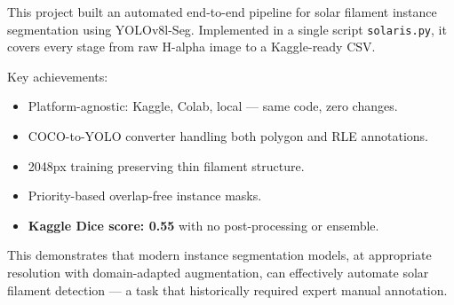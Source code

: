\documentclass[12pt,a4paper,openany]{report}
\begin{document}
This project built an automated end-to-end pipeline for solar filament instance segmentation
using YOLOv8l-Seg. Implemented in a single script \texttt{solaris.py}, it covers every stage
from raw H-alpha image to a Kaggle-ready CSV.

Key achievements:
\begin{itemize}
  \item Platform-agnostic: Kaggle, Colab, local --- same code, zero changes.
  \item COCO-to-YOLO converter handling both polygon and RLE annotations.
  \item 2048px training preserving thin filament structure.
  \item Priority-based overlap-free instance masks.
  \item \textbf{Kaggle Dice score: 0.55} with no post-processing or ensemble.
\end{itemize}

This demonstrates that modern instance segmentation models, at appropriate resolution with
domain-adapted augmentation, can effectively automate solar filament detection --- a task
that historically required expert manual annotation.
\end{document}
